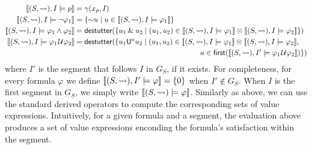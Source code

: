 \scriptsize
\begin{align*}
	\llbracket (S, {\hb}), I \models p \rrbracket &= \gamma(x_p, I) \\
	\llbracket (S, {\hb}), I \models \lnot \varphi_1 \rrbracket &= \{\BitNeg u \st u \in  \llbracket (S, {\hb}), I \models \varphi_1 \rrbracket \} \\
	\llbracket (S, {\hb}), I \models \varphi_1 \land \varphi_2 \rrbracket &= \destutter(\{ u_1 \BitAnd u_2 \st (u_1, u_2) \in \llbracket (S, {\hb}), I \models \varphi_1 \rrbracket \otimes \llbracket (S, {\hb}), I \models \varphi_2 \rrbracket  \}) \\
	\llbracket (S, {\hb}), I \models \varphi_1 \until \varphi_2 \rrbracket &= \destutter(\{ u_1 \mathsf{U}^a u_2 \st (u_1, u_2) \in \llbracket (S, {\hb}), I \models \varphi_1 \rrbracket \otimes \llbracket (S, {\hb}), I \models \varphi_2 \rrbracket, \\
	 &\hspace{17em} a \in \first(\llbracket (S, {\hb}), I' \models \varphi_1 \until \varphi_2 \rrbracket) \})
\end{align*}
\normalsize
where $I'$ is the segment that follows $I$ in $G_S$, if it exists.
For completeness, for every formula $\varphi$ we define $\llbracket (S, {\rightsquigarrow}), I' \models \varphi \rrbracket = \{0\}$ when $I' \notin G_S$.
When $I$ is the first segment in $G_S$, we simply write $\llbracket (S, {\rightsquigarrow}) \models \varphi \rrbracket$.
Similarly as above, we can use the standard derived operators to compute the corresponding sets of value expressions.
Intuitively, for a given formula and a segment, the evaluation above produces a set of value expressions enconding the formula's satisfaction within the segment.


